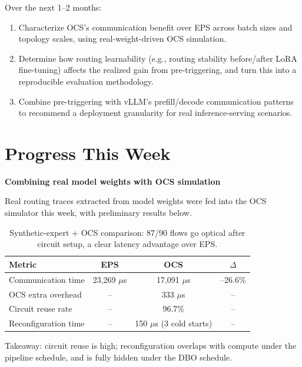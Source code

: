 \documentclass[11pt]{article}
\begin{document}
Over the next 1--2 months:
\begin{enumerate}
  \item Characterize OCS's communication benefit over EPS across batch
        sizes and topology scales, using real-weight-driven OCS simulation.
  \item Determine how routing learnability (e.g., routing stability
        before/after LoRA fine-tuning) affects the realized gain from
        pre-triggering, and turn this into a reproducible evaluation
        methodology.
  \item Combine pre-triggering with vLLM's prefill/decode communication
        patterns to recommend a deployment granularity for real
        inference-serving scenarios.
\end{enumerate}

\section{Progress This Week}

\textbf{Combining real model weights with OCS simulation}

Real routing traces extracted from model weights were fed into the OCS
simulator this week, with preliminary results below.

\begin{table}[htbp]
\centering
\small
\begin{tabular}{lccc}
\toprule
\textbf{Metric} & \textbf{EPS} & \textbf{OCS} & \textbf{$\Delta$} \\
\midrule
Communication time    & 23,269 $\mu$s & 17,091 $\mu$s & --26.6\% \\
OCS extra overhead     & --            & 333 $\mu$s    & -- \\
Circuit reuse rate     & --            & 96.7\%        & -- \\
Reconfiguration time    & --            & 150 $\mu$s (3 cold starts) & -- \\
\bottomrule
\end{tabular}
\caption{Synthetic-expert + OCS comparison: 87/90 flows go optical
after circuit setup, a clear latency advantage over EPS.}
\label{tab:ocs_eps}
\end{table}

\noindent Takeaway: circuit reuse is high; reconfiguration overlaps
with compute under the pipeline schedule, and is fully hidden under
the DBO schedule.

\end{document}
